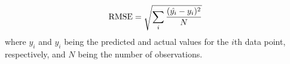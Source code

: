 $$\textnormal{RMSE}=\sqrt{\sum\limits_{i}\frac{(\hat{y_i}-y_i)^2}{N}}$$
where $\hat{y_i}$ and $y_i$ being the predicted and actual values for the $i$th data point, respectively, and $N$ being the number of observations.
